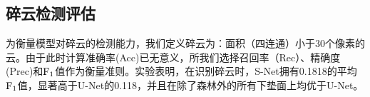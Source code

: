 \documentclass[10pt]{ctexart}
\begin{document}
\begin{multicols}{2}


\subsection{碎云检测评估}
为衡量模型对碎云的检测能力，我们定义碎云为：面积（四连通）小于30个像素的云。由于此时计算准确率(Acc)已无意义，所我们选择召回率（Rec）、精确度(Prec)和$\rm F_1$值作为衡量准则。实验表明，在识别碎云时，S-Net拥有0.1818的平均$\rm F_1$值，显著高于U-Net的0.118，并且在除了森林外的所有下垫面上均优于U-Net。

\end{multicols}
\end{document}
